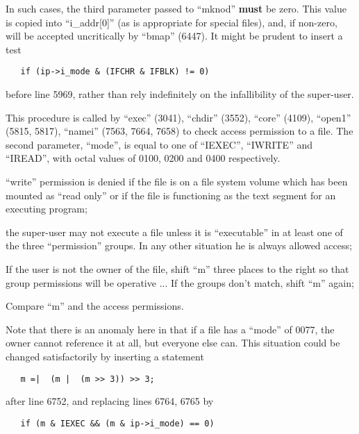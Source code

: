 In  such  cases,  the  third  parameter
passed  to  ``mknod'' {\bf must} be zero.  This
value is copied into ``i\_addr[0]'' (as is
appropriate for special files), and, if
non-zero, will be accepted uncritically
by  ``bmap''  (6447). It might be prudent
to insert a test

\begin{verbatim}
   if (ip->i_mode & (IFCHR & IFBLK) != 0)
\end{verbatim}

\noindent before  line  5969,  rather  than  rely
indefinitely  on  the  infallibility of
the super-user.



This  procedure  is  called  by  ``exec''
(3041),  ``chdir'' (3552), ``core'' (4109),
``open1'' (5815,  5817),  ``namei''  (7563,
7664,  7658) to check access permission
to  a  file.  The   second   parameter,
``mode'',  is  equal  to  one of ``IEXEC'',
``IWRITE'' and ``IREAD'', with octal values
of 0100, 0200 and 0400 respectively.

\bd
\item[6753:] ``write'' permission is  denied  if
      the  file  is  on  a  file system
      volume which has been mounted  as
      ``read  only''  or  if  the file is
      functioning as the  text  segment
      for an executing program;

\item[6763:] the super-user may not execute  a
file unless it is ``executable'' in
at least one of the  three  ``permission''  groups.  In  any  other
situation he  is  always  allowed
access;

\item[6769:] If the user is not the  owner  of
      the  file, shift ``m'' three places
      to the right so that  group  permissions will be operative ... If
      the groups don't match, shift ``m''
      again;

\item[6774:] Compare ``m'' and the  access  permissions.
\ed


Note that there is an anomaly  here  in
that  if  a  file has a ``mode'' of 0077,
the owner cannot reference it  at  all,
but  everyone  else can. This situation
could  be  changed  satisfactorily   by
inserting a statement

\begin{verbatim}
   m =|  (m |  (m >> 3)) >> 3;
\end{verbatim}

\noindent after line 6752,  and  replacing  lines
6764, 6765 by

\begin{verbatim}
   if (m & IEXEC && (m & ip->i_mode) == 0)
\end{verbatim}

